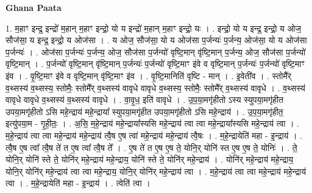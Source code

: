 \documentclass[17pt]{extarticle}
\begin{document}
\textbf{Ghana Paata } \newline

1. म॒हाꣳ इन्द्र॒ इन्द्रो॑ म॒हान् म॒हाꣳ इन्द्रो॒ यो य इन्द्रो॑ म॒हान् म॒हाꣳ इन्द्रो॒ यः । . इन्द्रो॒ यो य इन्द्र॒ इन्द्रो॒ य ओज॒ सौज॑सा॒ य इन्द्र॒ इन्द्रो॒ य ओज॑सा । . य ओज॒ सौज॑सा॒ यो य ओज॑सा प॒र्जन्यः॑ प॒र्जन्य॒ ओज॑सा॒ यो य ओज॑सा प॒र्जन्यः॑ । . ओज॑सा प॒र्जन्यः॑ प॒र्जन्य॒ ओज॒ सौज॑सा प॒र्जन्यो॑ वृष्टि॒मान् वृ॑ष्टि॒मान् प॒र्जन्य॒ ओज॒ सौज॑सा प॒र्जन्यो॑ वृष्टि॒मान् । . प॒र्जन्यो॑ वृष्टि॒मान् वृ॑ष्टि॒मान् प॒र्जन्यः॑ प॒र्जन्यो॑ वृष्टि॒माꣳ इ॑वे व वृष्टि॒मान् प॒र्जन्यः॑ प॒र्जन्यो॑ वृष्टि॒माꣳ इ॑व । . वृ॒ष्टि॒माꣳ इ॑वे व वृष्टि॒मान् वृ॑ष्टि॒माꣳ इ॑व । . वृ॒ष्टि॒मानिति॑ वृष्टि - मान् । . इ॒वेती॑व । . स्तोमै᳚र् व॒थ्सस्य॑ व॒थ्सस्य॒ स्तोमैः॒ स्तोमै᳚र् व॒थ्सस्य॑ वावृधे वावृधे व॒थ्सस्य॒ स्तोमैः॒ स्तोमै᳚र् व॒थ्सस्य॑ वावृधे । . व॒थ्सस्य॑ वावृधे वावृधे व॒थ्सस्य॑ व॒थ्सस्य॑ वावृधे । . वा॒वृ॒ध॒ इति॑ वावृधे । . उ॒प॒या॒मगृ॑हीतो ऽस्य स्युपया॒मगृ॑हीत उपया॒मगृ॑हीतो ऽसि महे॒न्द्राय॑ महे॒न्द्राया᳚ स्युपया॒मगृ॑हीत उपया॒मगृ॑हीतो ऽसि महे॒न्द्राय॑ । . उ॒प॒या॒मगृ॑हीत॒ इत्यु॑पया॒म - गृ॒ही॒तः॒ । . अ॒सि॒ म॒हे॒न्द्राय॑ महे॒न्द्राया᳚स्यसि महे॒न्द्राय॑ त्वा त्वा महे॒न्द्राया᳚स्यसि महे॒न्द्राय॑ त्वा । . म॒हे॒न्द्राय॑ त्वा त्वा महे॒न्द्राय॑ महे॒न्द्राय॑ त्वै॒ष ए॒ष त्वा॑ महे॒न्द्राय॑ महे॒न्द्राय॑ त्वै॒षः । . म॒हे॒न्द्रायेति॑ महा - इ॒न्द्राय॑ । . त्वै॒ष ए॒ष त्वा᳚ त्वै॒ष ते॑ त ए॒ष त्वा᳚ त्वै॒ष ते᳚ । . ए॒ष ते॑ त ए॒ष ए॒ष ते॒ योनि॒र् योनि॑ स्त ए॒ष ए॒ष ते॒ योनिः॑ । . ते॒ योनि॒र् योनि॑ स्ते ते॒ योनि॑र् महे॒न्द्राय॑ महे॒न्द्राय॒ योनि॑ स्ते ते॒ योनि॑र् महे॒न्द्राय॑ । . योनि॑र् महे॒न्द्राय॑ महे॒न्द्राय॒ योनि॒र् योनि॑र् महे॒न्द्राय॑ त्वा त्वा महे॒न्द्राय॒ योनि॒र् योनि॑र् महे॒न्द्राय॑ त्वा । . म॒हे॒न्द्राय॑ त्वा त्वा महे॒न्द्राय॑ महे॒न्द्राय॑ त्वा । . म॒हे॒न्द्रायेति॑ महा - इ॒न्द्राय॑ । . त्वेति॑ त्वा । \newline
\pagebreak
{}
\end{document}

